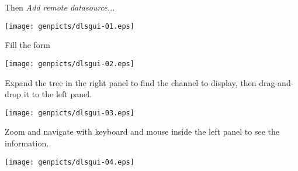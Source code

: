 \noindent Then \textit{Add remote datasource...}
\begin{center}
\texttt{[image: genpicts/dlsgui-01.eps]}
\end{center}

\noindent Fill the form
\begin{center}
\texttt{[image: genpicts/dlsgui-02.eps]}
\end{center}


\noindent Expand the tree in the right panel to find
the channel to display, then drag-and-drop it to the left panel.
\begin{center}
\texttt{[image: genpicts/dlsgui-03.eps]}
\end{center}

\noindent Zoom and navigate with keyboard and mouse inside the left panel
to see the information.
\begin{center}
\texttt{[image: genpicts/dlsgui-04.eps]}
\end{center}
